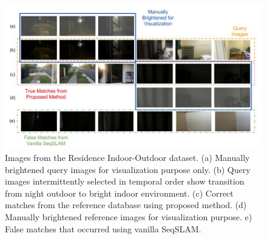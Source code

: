 \documentclass[letterpaper, 10 pt, conference]{ieeeconf}  %
\begin{document}

\newcommand{\imgW}{2.5cm}
\newcommand{\imgH}{1.4cm}

\begin{figure}
\centering
\includegraphics[scale=0.5]{residence-data}
% 
% 
%  
%  
\caption{Images from the Residence Indoor-Outdoor dataset. (a) Manually brightened query images for visualization purpose only. (b) Query images intermittently selected in temporal order show transition from night outdoor to bright indoor environment. (c) Correct matches from the reference database using proposed method. (d) Manually brightened reference images for visualization purpose. e) False matches that occurred using vanilla SeqSLAM.}
\label{fig:rioTransImages}
\end{figure}
\end{document}
